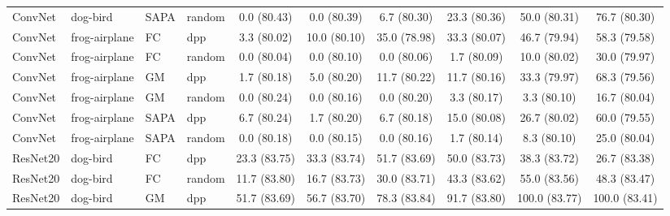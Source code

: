 \begin{table}[h]
{\begin{tabular}{llllcccccc}
ConvNet & dog-bird & SAPA & random
& 0.0 \small{(80.43)}
& 0.0 \small{(80.39)}
& 6.7 \small{(80.30)}
& 23.3 \small{(80.36)}
& 50.0 \small{(80.31)}
& 76.7 \small{(80.30)} \\ [1em]


ConvNet & frog-airplane & FC & dpp
& 3.3 \small{(80.02)}
& 10.0 \small{(80.10)}
& 35.0 \small{(78.98)}
& 33.3 \small{(80.07)}
& 46.7 \small{(79.94)}
& 58.3 \small{(79.58)} \\



ConvNet & frog-airplane & FC & random
& 0.0 \small{(80.04)}
& 0.0 \small{(80.10)}
& 0.0 \small{(80.06)}
& 1.7 \small{(80.09)}
& 10.0 \small{(80.02)}
& 30.0 \small{(79.97)} \\ [1em]


ConvNet & frog-airplane & GM & dpp
& 1.7 \small{(80.18)}
& 5.0 \small{(80.20)}
& 11.7 \small{(80.22)}
& 11.7 \small{(80.16)}
& 33.3 \small{(79.97)}
& 68.3 \small{(79.56)} \\


ConvNet & frog-airplane & GM & random
& 0.0 \small{(80.24)}
& 0.0 \small{(80.16)}
& 0.0 \small{(80.20)}
& 3.3 \small{(80.17)}
& 3.3 \small{(80.10)}
& 16.7 \small{(80.04)} \\ [1em]

ConvNet & frog-airplane & SAPA & dpp
& 6.7 \small{(80.24)}
& 1.7 \small{(80.20)}
& 6.7 \small{(80.18)}
& 15.0 \small{(80.08)}
& 26.7 \small{(80.02)}
& 60.0 \small{(79.55)} \\


ConvNet & frog-airplane & SAPA & random
& 0.0 \small{(80.18)}
& 0.0 \small{(80.15)}
& 0.0 \small{(80.16)}
& 1.7 \small{(80.14)}
& 8.3 \small{(80.10)}
& 25.0 \small{(80.04)} \\ [0.1em] 


\hline 


ResNet20 & dog-bird & FC & dpp
& 23.3 \small{(83.75)}
& 33.3 \small{(83.74)}
& 51.7 \small{(83.69)}
& 50.0 \small{(83.73)}
& 38.3 \small{(83.72)}
& 26.7 \small{(83.38)} \\



ResNet20 & dog-bird & FC & random
& 11.7 \small{(83.80)}
& 16.7 \small{(83.73)}
& 30.0 \small{(83.71)}
& 43.3 \small{(83.62)}
& 55.0 \small{(83.56)}
& 48.3 \small{(83.47)} \\
[1em]


ResNet20 & dog-bird & GM & dpp
& 51.7 \small{(83.69)}
& 56.7 \small{(83.70)}
& 78.3 \small{(83.84)}
& 91.7 \small{(83.80)}
& 100.0 \small{(83.77)}
& 100.0 \small{(83.41)} \\




\end{tabular}}
\end{table}
